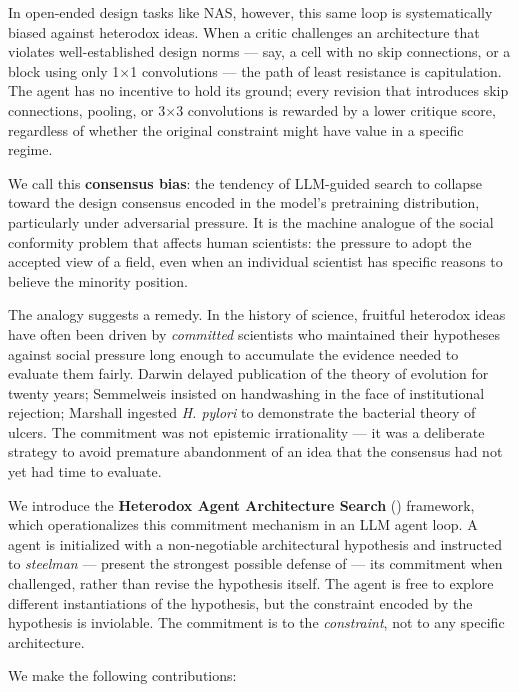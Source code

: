 In open-ended design tasks like NAS, however, this same loop is systematically
biased against heterodox ideas. When a critic challenges an architecture that
violates well-established design norms --- say, a cell with no skip connections,
or a block using only 1$\times$1 convolutions --- the path of least resistance
is capitulation. The agent has no incentive to hold
its ground; every revision that introduces skip connections, pooling, or 3$\times$3
convolutions is rewarded by a lower critique score, regardless of whether the
original constraint might have value in a specific regime.

We call this \textbf{consensus bias}: the tendency of LLM-guided search to
collapse toward the design consensus encoded in the model's pretraining
distribution, particularly under adversarial pressure. It is the machine
analogue of the social conformity problem that affects human scientists: the
pressure to adopt the accepted view of a field, even when an individual
scientist has specific reasons to believe the minority position.

The analogy suggests a remedy. In the history of science, fruitful heterodox
ideas have often been driven by \emph{committed} scientists who maintained their
hypotheses against social pressure long enough to accumulate the evidence needed
to evaluate them fairly. Darwin delayed publication of the theory of evolution
for twenty years; Semmelweis insisted on handwashing in the face of institutional
rejection; Marshall ingested \textit{H. pylori} to demonstrate the bacterial
theory of ulcers. The commitment was not epistemic irrationality --- it was a
deliberate strategy to avoid premature abandonment of an idea that the consensus
had not yet had time to evaluate.

We introduce the \textbf{Heterodox Agent Architecture Search} (\haas{})
framework, which operationalizes this commitment mechanism in an LLM agent loop.
A \haas{} agent is initialized with a non-negotiable architectural hypothesis
and instructed to \emph{steelman} --- present the strongest possible defense of
--- its commitment when challenged, rather than revise the hypothesis itself.
The agent is free to explore different instantiations of the hypothesis, but
the constraint encoded by the hypothesis is inviolable. The commitment is to
the \emph{constraint}, not to any specific architecture.

We make the following contributions:

